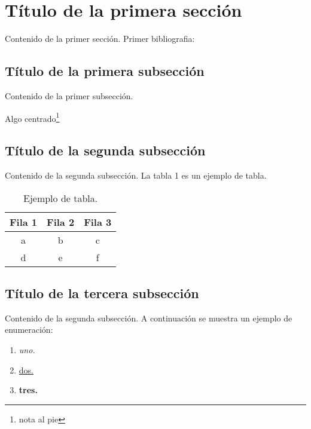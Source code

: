 \section{Título de la primera sección}
Contenido de la primer sección. Primer bibliografia:\cite{bib1}


\subsection{Título de la primera subsección}
Contenido de la primer subsección. 

\begin{center}
Algo centrado\footnote{nota al pie} %
\end{center}


\subsection{Título de la segunda subsección}
Contenido de la segunda subsección. La tabla 1 es un ejemplo de tabla.

\begin{table} [h]%
    \begin{center}
        \begin{tabular}{ccc} %
            \textbf{Fila 1} & {Fila 2} & {Fila 3} \\ \hline %
            a & b & c \\
            d & e & f \\ \hline %
        \end{tabular}
    \end{center}
    \caption{Ejemplo de tabla. \label{tabla}}
\end{table}

\subsection{Título de la tercera subsección}
Contenido de la segunda subsección. A continuación se muestra un ejemplo de enumeración:

\begin{enumerate}
    \item \textit{uno.}
    \item \underline{dos.}
    \item \textbf{tres.}
\end{enumerate}
